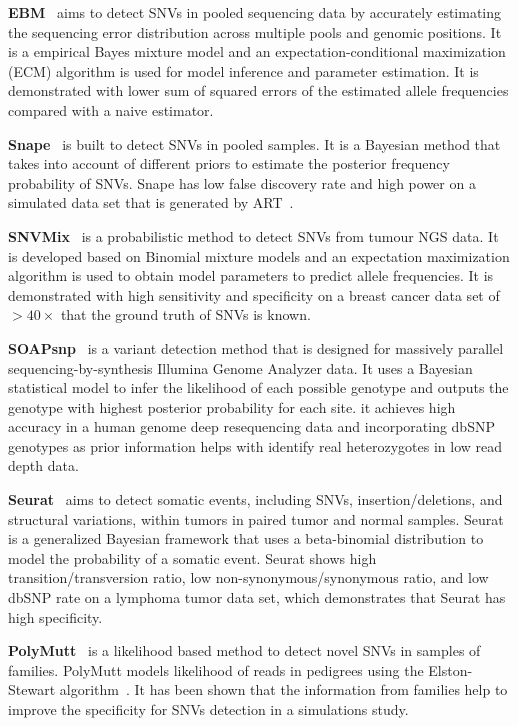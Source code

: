 \documentclass[a4,center,fleqn]{NAR}
\begin{document}
\textbf{EBM}~\citep{Zhou2012} aims to detect SNVs in pooled sequencing data by accurately estimating the sequencing error distribution across multiple pools and genomic positions. 
It is a empirical Bayes mixture model and an expectation-conditional maximization (ECM) algorithm is used for model inference and parameter estimation.
It is demonstrated with lower sum of squared errors of the estimated allele frequencies compared with a naive estimator.

\textbf{Snape}~\citep{Raineri2012} is built to detect SNVs in pooled samples.
It is a Bayesian method that takes into account of different priors to estimate the posterior frequency probability of SNVs.
Snape has low false discovery rate and high power on a simulated data set that is generated by ART~\citep{huang2012art}.

\textbf{SNVMix}~\citep{Goya2010} is a probabilistic method to detect SNVs from tumour NGS data.
It is developed based on Binomial mixture models and an expectation maximization algorithm is used to obtain model parameters to predict allele frequencies.
It is demonstrated with high sensitivity and specificity on a breast cancer data set of $> 40 \times$ that the ground truth of SNVs is known.

\textbf{SOAPsnp}~\citep{Li2009} is a variant detection method that is designed for massively parallel sequencing-by-synthesis Illumina Genome Analyzer data.
It uses a Bayesian statistical model to infer the likelihood of each possible genotype and outputs the genotype with highest posterior probability for each site.
it achieves high accuracy in a human genome deep resequencing data and incorporating dbSNP genotypes as prior information helps with identify real heterozygotes in low read depth data.

\textbf{Seurat}~\citep{Christoforides2013} aims to detect somatic events, including SNVs, insertion/deletions, and structural variations, within tumors in paired tumor and normal samples.
Seurat is a generalized Bayesian framework that uses a beta-binomial distribution to model the probability of a somatic event.
Seurat shows high transition/transversion ratio, low non-synonymous/synonymous ratio, and low dbSNP rate on a lymphoma tumor data set, which demonstrates that Seurat has high specificity.

\textbf{PolyMutt}~\citep{li2012likelihood} is a likelihood based method to detect novel SNVs in samples of families.
PolyMutt models likelihood of reads in pedigrees using the Elston-Stewart algorithm~\citep{elston1971general}.
It has been shown that the information from families help to improve the specificity for SNVs detection in a simulations study.
\end{document}
